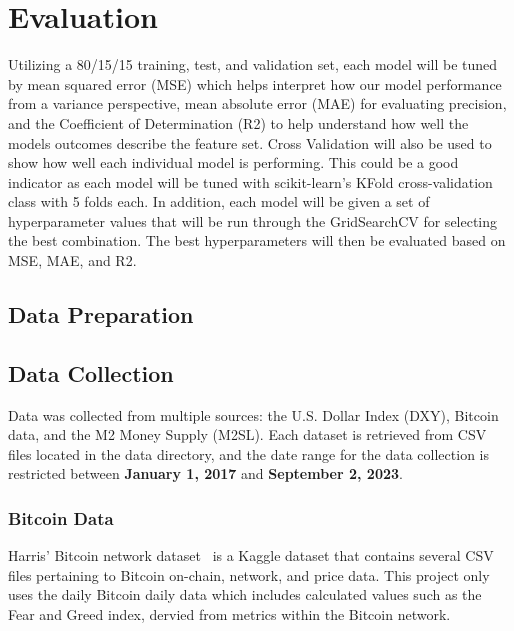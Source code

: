 \section{Evaluation}\label{sec:evaluation}

Utilizing a 80/15/15 training, test, and validation set, each model will be tuned by mean squared error (MSE) which helps
interpret how our model performance from a variance perspective, mean absolute error (MAE) for evaluating precision, and
the Coefficient of Determination (R2) to help understand how well the models outcomes describe the feature set. Cross
Validation will also be used to show how well each individual model is performing. This could be a good indicator as 
each model will be tuned with scikit-learn's KFold cross-validation class with 5 folds each. In addition, each model will
be given a set of hyperparameter values that will be run through the GridSearchCV for selecting the best combination.
The best hyperparameters will then be evaluated based on MSE, MAE, and R2. 

\subsection{Data Preparation}\label{sec:data_preparation_eval}

\subsection{Data Collection}\label{sec:data_collection}

Data was collected from multiple sources: the U.S. Dollar Index (DXY), Bitcoin data, and the M2 Money Supply (M2SL). Each
dataset is retrieved from CSV files located in the data directory, and the date range for the data collection is restricted
between \textbf{January 1, 2017} and \textbf{September 2, 2023}.

\subsubsection{Bitcoin Data}\label{sec:bitcoin_data}

Harris' Bitcoin network dataset\ \cite{bitcoinData} is a Kaggle dataset that contains several CSV files pertaining to Bitcoin on-chain, network, and
price data. This project only uses the daily Bitcoin daily data which includes calculated values such as the
Fear and Greed index, dervied from metrics within the Bitcoin network.

